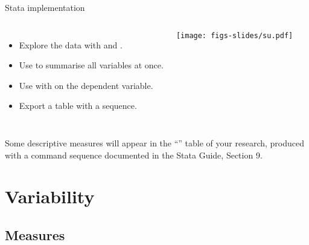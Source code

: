 \documentclass{beamer}
\begin{document}
	\begin{frame}[t]{Stata implementation}
	
	\begin{columns}
	\begin{itemize}
	\item Explore the data with  and .
	\item Use  to summarise all variables at once.
	\item Use  with  on the dependent variable.
	\item Export a table with a  sequence.
	\end{itemize}
	\begin{center}
		\texttt{[image: figs-slides/su.pdf]}	
	\end{center}
	\end{columns}
	\vspace{1.5em}	
	Some descriptive measures will appear in the ``'' table of your research, produced with a  command sequence documented in the Stata Guide, Section 9.
	\end{frame}
	
	
	\section{Variability}


	\subsection{Measures}

\end{document}
